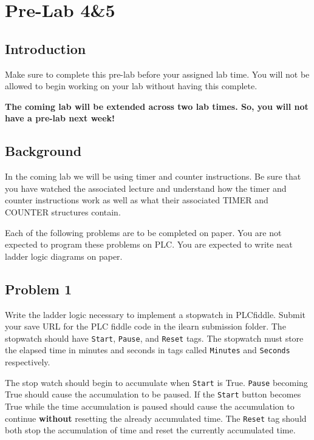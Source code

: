 \chapter{Pre-Lab 4\&5}
\setcounter{TASignatures}{0}
\setcounter{AsideCounter}{0}

\section{Introduction}

Make sure to complete this pre-lab before your assigned lab time. You will not be allowed to begin working on your lab without having this complete.

\textbf{The coming lab will be extended across two lab times. So, you will not have a pre-lab next week!}

\section{Background}


In the coming lab we will be using timer and counter instructions. Be sure that you have watched the associated lecture and understand how the timer and counter instructions work as well as what their associated TIMER and COUNTER structures contain.


Each of the following problems are to be completed on paper. You are not expected to program these problems on PLC. You are expected to write neat ladder logic diagrams on paper.


\section{Problem 1}

Write the ladder logic necessary to implement a stopwatch in PLCfiddle. Submit your save URL for the PLC fiddle code in the ilearn submission folder. The stopwatch should have \verb|Start|, \verb|Pause|, and \verb|Reset| tags. The stopwatch must store the elapsed time in minutes and seconds in tags called \verb|Minutes| and \verb|Seconds| respectively. 

The stop watch should begin to accumulate when \verb|Start| is True. \verb|Pause|  becoming True should cause the accumulation to be paused. If the \verb|Start| button becomes True while the time accumulation is paused should cause the accumulation to continue \textbf{without} resetting the already accumulated time. The \verb|Reset| tag should both stop the accumulation of time and reset the currently accumulated time.



